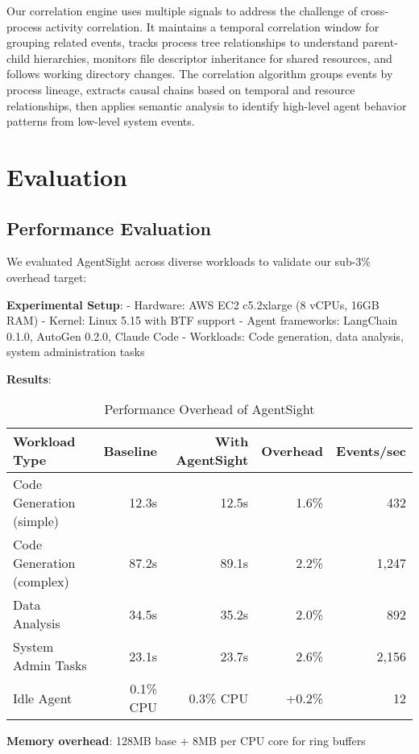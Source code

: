 \documentclass[sigplan,screen，review,9pt]{acmart}
\begin{document}
Our correlation engine uses multiple signals to address the challenge of cross-process activity correlation. It maintains a temporal correlation window for grouping related events, tracks process tree relationships to understand parent-child hierarchies, monitors file descriptor inheritance for shared resources, and follows working directory changes. The correlation algorithm groups events by process lineage, extracts causal chains based on temporal and resource relationships, then applies semantic analysis to identify high-level agent behavior patterns from low-level system events.


\section{Evaluation}

\subsection{Performance Evaluation}

We evaluated AgentSight across diverse workloads to validate our sub-3\% overhead target:

\textbf{Experimental Setup}:
- Hardware: AWS EC2 c5.2xlarge (8 vCPUs, 16GB RAM)
- Kernel: Linux 5.15 with BTF support
- Agent frameworks: LangChain 0.1.0, AutoGen 0.2.0, Claude Code
- Workloads: Code generation, data analysis, system administration tasks

\textbf{Results}:

\begin{table}[h]
\centering
\caption{Performance Overhead of AgentSight}
\label{tab:performance}
\begin{tabular}{lrrrr}
\toprule
Workload Type & Baseline & With AgentSight & Overhead & Events/sec \\
\midrule
Code Generation (simple) & 12.3s & 12.5s & 1.6\% & 432 \\
Code Generation (complex) & 87.2s & 89.1s & 2.2\% & 1,247 \\
Data Analysis & 34.5s & 35.2s & 2.0\% & 892 \\
System Admin Tasks & 23.1s & 23.7s & 2.6\% & 2,156 \\
Idle Agent & 0.1\% CPU & 0.3\% CPU & +0.2\% & 12 \\
\bottomrule
\end{tabular}
\end{table}

\textbf{Memory overhead}: 128MB base + 8MB per CPU core for ring buffers
\end{document}
